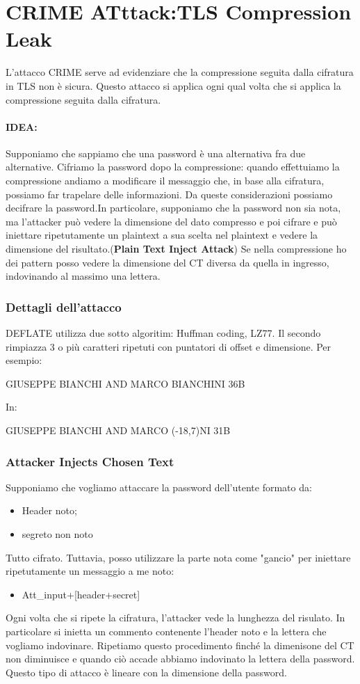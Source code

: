 \documentclass{article}
\theoremstyle{remark}
\begin{document}
\section{CRIME ATttack:TLS Compression Leak}
L'attacco CRIME serve ad evidenziare che la compressione seguita dalla cifratura in TLS non è sicura. Questo attacco si applica ogni qual volta che si applica la compressione seguita dalla cifratura. 
\paragraph{IDEA:}Supponiamo che sappiamo che una password è una alternativa fra due alternative. Cifriamo la password dopo la compressione: quando effettuiamo la compressione andiamo a modificare il messaggio che, in base alla cifratura, possiamo far trapelare delle informazioni. Da queste considerazioni possiamo decifrare la password.\newline In particolare, supponiamo che la password non sia nota, ma l'attacker può vedere la dimensione del dato compresso e poi cifrare e può iniettare ripetutamente un plaintext a sua scelta nel plaintext e vedere la dimensione del risultato.(\textbf{Plain Text Inject Attack}) Se nella compressione ho dei pattern posso vedere la dimensione del CT diversa da quella in ingresso, indovinando al massimo una lettera.\newline
\subsubsection{Dettagli dell'attacco}
DEFLATE utilizza due sotto algoritim: Huffman coding, LZ77. Il secondo rimpiazza 3 o più caratteri ripetuti con puntatori di offset e dimensione. Per esempio:\begin{center}
    GIUSEPPE BIANCHI AND MARCO BIANCHINI   36B
\end{center}
In:\begin{center}
    GIUSEPPE BIANCHI AND MARCO (-18,7)NI   31B
\end{center}
\subsubsection{Attacker Injects Chosen Text}
Supponiamo che vogliamo attaccare la password dell'utente formato da:\begin{itemize}
    \item Header noto;\item segreto non noto
\end{itemize}
Tutto cifrato. Tuttavia, posso utilizzare la parte nota come "gancio" per iniettare ripetutamente un messaggio a me noto:\begin{itemize}
    \item Att\_input+[header+secret]
\end{itemize}
Ogni volta che si ripete la cifratura, l'attacker vede la lunghezza del risulato. In particolare si inietta un commento contenente l'header noto e la lettera che vogliamo indovinare. Ripetiamo questo procedimento finché la dimenisone del CT non diminuisce e quando ciò accade abbiamo indovinato la lettera della password. Questo tipo di attacco è lineare con la dimensione della password.
\end{document}
